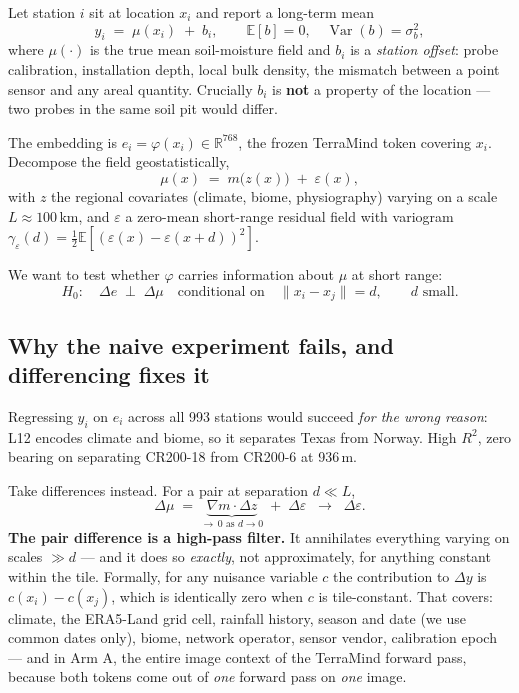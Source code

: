 \documentclass[11pt,a4paper]{article}
\newcommand{\Var}{\operatorname{Var}}
\newcommand{\E}{\mathbb{E}}
\newcommand{\R}{\mathbb{R}}
\begin{document}
Let station $i$ sit at location $x_i$ and report a long-term mean
\begin{equation}
  y_i \;=\; \mu(x_i) \;+\; b_i,
  \qquad \E[b] = 0,\quad \Var(b) = \sigma_b^2,
  \label{eq:model}
\end{equation}
where $\mu(\cdot)$ is the true mean soil-moisture field and $b_i$ is a
\emph{station offset}: probe calibration, installation depth, local bulk density,
the mismatch between a point sensor and any areal quantity. Crucially $b_i$ is
\textbf{not} a property of the location --- two probes in the same soil pit would differ.

The embedding is $e_i = \varphi(x_i) \in \R^{768}$, the frozen TerraMind token covering
$x_i$. Decompose the field geostatistically,
\begin{equation}
  \mu(x) \;=\; m\big(z(x)\big) \;+\; \varepsilon(x),
  \label{eq:decomp}
\end{equation}
with $z$ the regional covariates (climate, biome, physiography) varying on a scale
$L \approx 100$\,km, and $\varepsilon$ a zero-mean short-range residual field with
variogram $\gamma_\varepsilon(d) = \tfrac12\E[(\varepsilon(x) - \varepsilon(x+d))^2]$.

We want to test whether $\varphi$ carries information about $\mu$ at short range:
\begin{equation}
  H_0:\quad \Delta e \;\perp\; \Delta \mu
  \quad\text{conditional on}\quad \lVert x_i - x_j\rVert = d,
  \qquad d \text{ small.}
\end{equation}

\subsection{Why the naive experiment fails, and differencing fixes it}

Regressing $y_i$ on $e_i$ across all 993 stations would succeed \emph{for the wrong
reason}: L12 encodes climate and biome, so it separates Texas from Norway. High $R^2$,
zero bearing on separating CR200-18 from CR200-6 at 936\,m.

Take differences instead. For a pair at separation $d \ll L$,
\begin{equation}
  \Delta\mu \;=\; \underbrace{\nabla m \cdot \Delta z}_{\to\, 0 \text{ as } d \to 0}
  \;+\; \Delta\varepsilon
  \;\;\longrightarrow\;\; \Delta\varepsilon .
  \label{eq:highpass}
\end{equation}
\textbf{The pair difference is a high-pass filter.} It annihilates everything varying on
scales $\gg d$ --- and it does so \emph{exactly}, not approximately, for anything constant
within the tile. Formally, for any nuisance variable $c$ the contribution to $\Delta y$ is
$c(x_i) - c(x_j)$, which is identically zero when $c$ is tile-constant. That covers:
climate, the ERA5-Land grid cell, rainfall history, season and date (we use common dates
only), biome, network operator, sensor vendor, calibration epoch --- and in Arm A, the
entire image context of the TerraMind forward pass, because both tokens come out of
\emph{one} forward pass on \emph{one} image.
\end{document}
